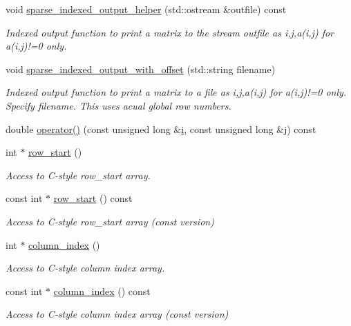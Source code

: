 \begin{DoxyCompactItemize}
void \hyperlink{classoomph_1_1CRDoubleMatrix_a468055aa2e36ff270a769a74c9ac2856}{sparse\+\_\+indexed\+\_\+output\+\_\+helper} (std\+::ostream \&outfile) const
\begin{DoxyCompactList}\small\item\em Indexed output function to print a matrix to the stream outfile as i,j,a(i,j) for a(i,j)!=0 only. \end{DoxyCompactList}\item 
void \hyperlink{classoomph_1_1CRDoubleMatrix_a2b5dcdc5e1b9ccea51647f02b3239e66}{sparse\+\_\+indexed\+\_\+output\+\_\+with\+\_\+offset} (std\+::string filename)
\begin{DoxyCompactList}\small\item\em Indexed output function to print a matrix to a file as i,j,a(i,j) for a(i,j)!=0 only. Specify filename. This uses acual global row numbers. \end{DoxyCompactList}\item 
double \hyperlink{classoomph_1_1CRDoubleMatrix_af5b1d934bae618c92aa1089671b6130e}{operator()} (const unsigned long \&\hyperlink{cfortran_8h_adb50e893b86b3e55e751a42eab3cba82}{i}, const unsigned long \&j) const
\item 
int $\ast$ \hyperlink{classoomph_1_1CRDoubleMatrix_a25f1efd00318183abd8c65efede3f3f4}{row\+\_\+start} ()
\begin{DoxyCompactList}\small\item\em Access to C-\/style row\+\_\+start array. \end{DoxyCompactList}\item 
const int $\ast$ \hyperlink{classoomph_1_1CRDoubleMatrix_a9c7f058048764537f4d4ecadded5dd7c}{row\+\_\+start} () const
\begin{DoxyCompactList}\small\item\em Access to C-\/style row\+\_\+start array (const version) \end{DoxyCompactList}\item 
int $\ast$ \hyperlink{classoomph_1_1CRDoubleMatrix_a21b3dbb8ee74e1247f80ce4506c395f8}{column\+\_\+index} ()
\begin{DoxyCompactList}\small\item\em Access to C-\/style column index array. \end{DoxyCompactList}\item 
const int $\ast$ \hyperlink{classoomph_1_1CRDoubleMatrix_a886a481d11974f5707405f573fcb9850}{column\+\_\+index} () const
\begin{DoxyCompactList}\small\item\em Access to C-\/style column index array (const version) \end{DoxyCompactList}\item 

\end{DoxyCompactItemize}
